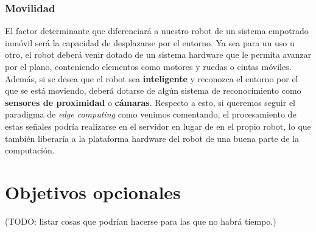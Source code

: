 \subsubsection{Movilidad}

El factor determinante que diferenciará a nuestro robot de un sistema empotrado inmóvil será la capacidad de desplazarse por el entorno. Ya sea para un uso u otro, el robot deberá venir dotado de un sistema hardware que le permita avanzar por el plano, conteniendo elementos como motores y ruedas o cintas móviles.\\

Además, si se desea que el robot sea \textbf{inteligente} y reconozca el entorno por el que se está moviendo, deberá dotarse de algún sistema de reconocimiento como \textbf{sensores de proximidad} o \textbf{cámaras}. Respecto a esto, si queremos seguir el paradigma de \textit{edge computing} como venimos comentando, el procesamiento de estas señales podría realizarse en el servidor en lugar de en el propio robot, lo que también liberaría a la plataforma hardware del robot de una buena parte de la computación.\\


\section{Objetivos opcionales}

(TODO: listar cosas que podrían hacerse para las que no habrá tiempo.)